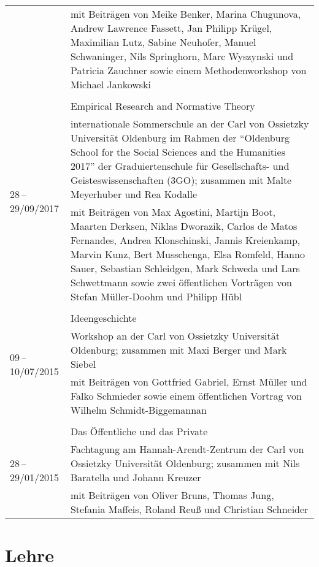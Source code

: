 \documentclass[a4paper,10pt]{article}
\begin{document}
\begin{longtable}{p{2cm}p{}}
& \footnotesize{mit Beiträgen von Meike Benker, Marina Chugunova, Andrew Lawrence Fassett, Jan Philipp Krügel, Maximilian Lutz, Sabine Neuhofer, Manuel Schwaninger, Nils Springhorn, Marc Wyszynski und Patricia Zauchner sowie einem Methodenworkshop von Michael Jankowski}\\
\\
\multirow{3}{2cm}{\footnotesize{28\,--\,29/09/2017}} & Empirical Research and Normative Theory\\
& \footnotesize{internationale Sommerschule an der Carl von Ossietzky Universität Oldenburg im Rahmen der \enquote{Oldenburg School for the Social Sciences and the Humanities 2017} der Graduiertenschule für Gesellschafts- und Geisteswissenschaften (3GO); zusammen mit Malte Meyerhuber und Rea Kodalle}\\
& \footnotesize{mit Beiträgen von Max Agostini, Martijn Boot, Maarten Derksen, Niklas Dworazik, Carlos de Matos Fernandes, Andrea Klonschinski, Jannis Kreienkamp, Marvin Kunz, Bert Musschenga, Elsa Romfeld, Hanno Sauer, Sebastian Schleidgen, Mark Schweda und Lars Schwettmann sowie zwei öffentlichen Vorträgen von Stefan Müller-Doohm und Philipp Hübl}\\
\\
\multirow{3}{2cm}{\footnotesize{09\,--\,10/07/2015}} & Ideengeschichte\\
& \footnotesize{Workshop an der Carl von Ossietzky Universität Oldenburg; zusammen mit Maxi Berger und Mark Siebel}\\
& \footnotesize{mit Beiträgen von Gottfried Gabriel, Ernst Müller und Falko Schmieder sowie einem öffentlichen Vortrag von Wilhelm Schmidt-Biggemannan}\\
\\
\multirow{3}{2cm}{\footnotesize{28\,--\,29/01/2015}} & Das Öffentliche und das Private\\
& \footnotesize{Fachtagung am Hannah-Arendt-Zentrum der Carl von Ossietzky Universität Oldenburg; zusammen mit Nils Baratella und Johann Kreuzer}\\
& \footnotesize{mit Beiträgen von Oliver Bruns, Thomas Jung, Stefania Maffeis, Roland Reuß und Christian Schneider}\\
\end{longtable}


\clearpage
\section{Lehre}
\end{document}
